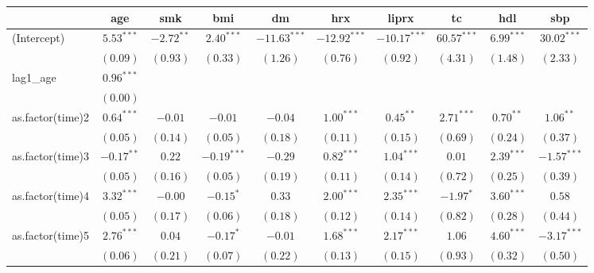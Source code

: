 
\begin{tabular}{l c c c c c c c c c}
\toprule
 & age & smk & bmi & dm & hrx & liprx & tc & hdl & sbp \\
\midrule
(Intercept)         & $5.53^{***}$ & $-2.72^{**}$ & $2.40^{***}$  & $-11.63^{***}$ & $-12.92^{***}$ & $-10.17^{***}$ & $60.57^{***}$  & $6.99^{***}$  & $30.02^{***}$ \\
                    & $(0.09)$     & $(0.93)$     & $(0.33)$      & $(1.26)$       & $(0.76)$       & $(0.92)$       & $(4.31)$       & $(1.48)$      & $(2.33)$      \\
lag1\_age           & $0.96^{***}$ &              &               &                &                &                &                &               &               \\
                    & $(0.00)$     &              &               &                &                &                &                &               &               \\
as.factor(time)2    & $0.64^{***}$ & $-0.01$      & $-0.01$       & $-0.04$        & $1.00^{***}$   & $0.45^{**}$    & $2.71^{***}$   & $0.70^{**}$   & $1.06^{**}$   \\
                    & $(0.05)$     & $(0.14)$     & $(0.05)$      & $(0.18)$       & $(0.11)$       & $(0.15)$       & $(0.69)$       & $(0.24)$      & $(0.37)$      \\
as.factor(time)3    & $-0.17^{**}$ & $0.22$       & $-0.19^{***}$ & $-0.29$        & $0.82^{***}$   & $1.04^{***}$   & $0.01$         & $2.39^{***}$  & $-1.57^{***}$ \\
                    & $(0.05)$     & $(0.16)$     & $(0.05)$      & $(0.19)$       & $(0.11)$       & $(0.14)$       & $(0.72)$       & $(0.25)$      & $(0.39)$      \\
as.factor(time)4    & $3.32^{***}$ & $-0.00$      & $-0.15^{*}$   & $0.33$         & $2.00^{***}$   & $2.35^{***}$   & $-1.97^{*}$    & $3.60^{***}$  & $0.58$        \\
                    & $(0.05)$     & $(0.17)$     & $(0.06)$      & $(0.18)$       & $(0.12)$       & $(0.14)$       & $(0.82)$       & $(0.28)$      & $(0.44)$      \\
as.factor(time)5    & $2.76^{***}$ & $0.04$       & $-0.17^{*}$   & $-0.01$        & $1.68^{***}$   & $2.17^{***}$   & $1.06$         & $4.60^{***}$  & $-3.17^{***}$ \\
                    & $(0.06)$     & $(0.21)$     & $(0.07)$      & $(0.22)$       & $(0.13)$       & $(0.15)$       & $(0.93)$       & $(0.32)$      & $(0.50)$      \\

\end{tabular}
